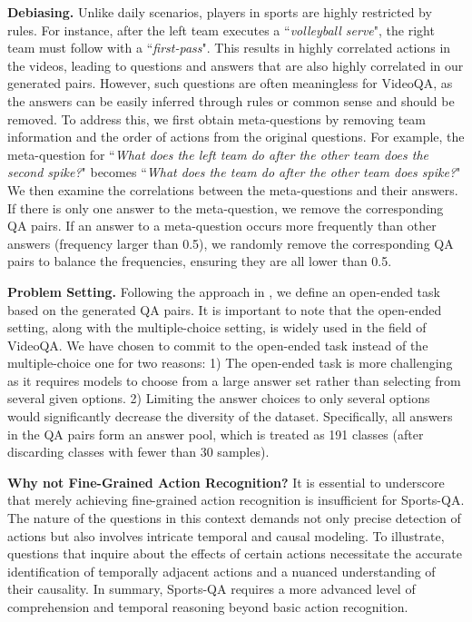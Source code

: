 \noindent \textbf{Debiasing.} Unlike daily scenarios, players in sports are highly restricted by rules. For instance, after the left team executes a ``\textit{volleyball serve}", the right team must follow with a ``\textit{first-pass}". This results in highly correlated actions in the videos, leading to questions and answers that are also highly correlated in our generated pairs. However, such questions are often meaningless for VideoQA, as the answers can be easily inferred through rules or common sense and should be removed.
To address this, we first obtain meta-questions by removing team information and the order of actions from the original questions. For example, the meta-question for ``\textit{What does the left team do after the other team does the second spike?}" becomes ``\textit{What does the team do after the other team does spike?}" We then examine the correlations between the meta-questions and their answers. If there is only one answer to the meta-question, we remove the corresponding QA pairs. If an answer to a meta-question occurs more frequently than other answers (frequency larger than 0.5), we randomly remove the corresponding QA pairs to balance the frequencies, ensuring they are all lower than 0.5.

\noindent \textbf{Problem Setting.} Following the approach in \citep{jang2017tgif, xu2017video}, we define an open-ended task based on the generated QA pairs. It is important to note that the open-ended setting, along with the multiple-choice setting, is widely used in the field of VideoQA. We have chosen to commit to the open-ended task instead of the multiple-choice one for two reasons: 1) The open-ended task is more challenging as it requires models to choose from a large answer set rather than selecting from several given options. 2) Limiting the answer choices to only several options would significantly decrease the diversity of the dataset. Specifically, all answers in the QA pairs form an answer pool, which is treated as 191 classes (after discarding classes with fewer than 30 samples). 

\noindent \textbf{Why not Fine-Grained Action Recognition?} It is essential to underscore that merely achieving fine-grained action recognition is insufficient for Sports-QA. The nature of the questions in this context demands not only precise detection of actions but also involves intricate temporal and causal modeling. To illustrate, questions that inquire about the effects of certain actions necessitate the accurate identification of temporally adjacent actions and a nuanced understanding of their causality. In summary, Sports-QA requires a more advanced level of comprehension and temporal reasoning beyond basic action recognition.

